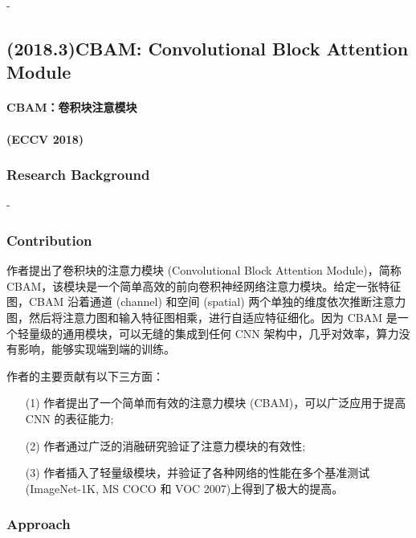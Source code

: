 \documentclass[a4paper, 10pt]{article}
\begin{document}
			-

		\subsection{(2018.3)CBAM: Convolutional Block Attention Module}
		
		\paragraph{CBAM：卷积块注意模块}
		
		\paragraph{(ECCV 2018)}

		\subsubsection{Research Background}

		-
		
		\subsubsection{Contribution}
		
		作者提出了卷积块的注意力模块 (Convolutional Block Attention Module)，简称 CBAM，该模块是一个简单高效的前向卷积神经网络注意力模块。给定一张特征图，CBAM 沿着通道 (channel) 和空间 (spatial) 两个单独的维度依次推断注意力图，然后将注意力图和输入特征图相乘，进行自适应特征细化。因为 CBAM 是一个轻量级的通用模块，可以无缝的集成到任何 CNN 架构中，几乎对效率，算力没有影响，能够实现端到端的训练。
		
		作者的主要贡献有以下三方面：
		
		\begin{itemize}
			\item[(1)] 
			作者提出了一个简单而有效的注意力模块 (CBAM)，可以广泛应用于提高 CNN 的表征能力;
			
			\item[(2)]
			作者通过广泛的消融研究验证了注意力模块的有效性;
			
			\item[(3)]
			作者插入了轻量级模块，并验证了各种网络的性能在多个基准测试(ImageNet-1K, MS COCO 和 VOC 2007)上得到了极大的提高。
			
		\end{itemize}	
		
		\subsubsection{Approach}
		
\end{document}
